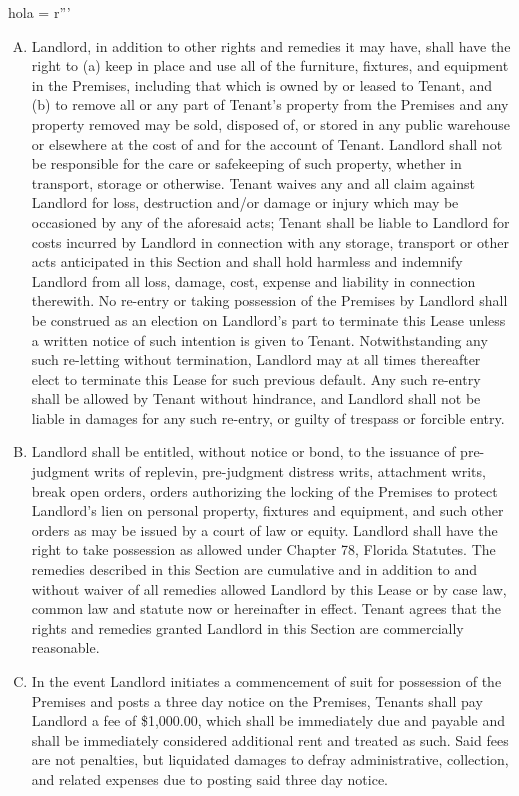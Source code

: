 hola = r'''\documentclass{article}
\begin{document}
\begin{enumerate}[(A)]
    \item	Landlord, in addition to other rights and remedies it may have, shall have the right to (a) keep in place and use all of the furniture, fixtures, and equipment in the Premises, including that which is owned by or leased to Tenant, and (b) to remove all or any part of Tenant's property from the Premises and any property removed may be sold, disposed of, or stored in any public warehouse or elsewhere at the cost of and for	the account of Tenant. Landlord shall not be responsible for the care or safekeeping of such property, whether in transport, storage or otherwise.  Tenant waives any and all claim against Landlord for loss, destruction and/or damage or injury which may be occasioned by any of the aforesaid acts; Tenant shall be liable to Landlord for costs incurred by Landlord in connection with any storage, transport or other acts anticipated in this Section and shall hold harmless and indemnify Landlord from all loss, damage, cost, expense and liability in connection therewith. No re-entry or taking possession of the Premises by Landlord shall be construed as an election on Landlord's part to terminate this Lease unless a written notice of such intention is given to Tenant. Notwithstanding any such re-letting without termination, Landlord may at all times thereafter elect to terminate this Lease for such previous default. Any such re-entry shall be allowed by Tenant without hindrance, and Landlord shall not be liable in damages for any such re-entry, or guilty of trespass or forcible entry.

    \item	Landlord shall be entitled, without notice or bond, to the issuance of pre-judgment writs of replevin, pre-judgment distress writs, attachment writs, break open orders, orders authorizing the locking of the Premises to protect Landlord's lien on personal property, fixtures and equipment, and such other orders as may be issued by a court of law or equity. Landlord shall have the right to take possession as allowed under Chapter 78, Florida Statutes. The remedies described in this Section are cumulative and in addition to and without waiver of all remedies allowed Landlord by this Lease or by case law, common law and statute now or hereinafter in effect. Tenant agrees that the rights and remedies granted Landlord in this Section are commercially reasonable.

	\item	In the event Landlord initiates a commencement of suit for possession of the Premises and posts a three day notice on the Premises, Tenants shall pay Landlord a fee of \$1,000.00, which shall be immediately due and payable and shall be immediately considered additional rent and treated as such.  Said fees are not penalties, but liquidated damages to defray administrative, collection, and related expenses due to posting said three day notice.  
    \end{enumerate}
\end{document}
